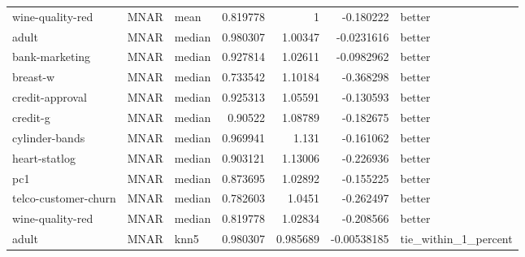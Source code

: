 \begin{table}[ht]
\begin{tabular}{lllrrrl}
 wine-quality-red     & MNAR        & mean             &                                 0.819778 &                             1        &                    -0.180222   & better               \\
 adult                & MNAR        & median           &                                 0.980307 &                             1.00347  &                    -0.0231616  & better               \\
 bank-marketing       & MNAR        & median           &                                 0.927814 &                             1.02611  &                    -0.0982962  & better               \\
 breast-w             & MNAR        & median           &                                 0.733542 &                             1.10184  &                    -0.368298   & better               \\
 credit-approval      & MNAR        & median           &                                 0.925313 &                             1.05591  &                    -0.130593   & better               \\
 credit-g             & MNAR        & median           &                                 0.90522  &                             1.08789  &                    -0.182675   & better               \\
 cylinder-bands       & MNAR        & median           &                                 0.969941 &                             1.131    &                    -0.161062   & better               \\
 heart-statlog        & MNAR        & median           &                                 0.903121 &                             1.13006  &                    -0.226936   & better               \\
 pc1                  & MNAR        & median           &                                 0.873695 &                             1.02892  &                    -0.155225   & better               \\
 telco-customer-churn & MNAR        & median           &                                 0.782603 &                             1.0451   &                    -0.262497   & better               \\
 wine-quality-red     & MNAR        & median           &                                 0.819778 &                             1.02834  &                    -0.208566   & better               \\
 adult                & MNAR        & knn5             &                                 0.980307 &                             0.985689 &                    -0.00538185 & tie\_within\_1\_percent \\

\end{tabular}
\end{table}
